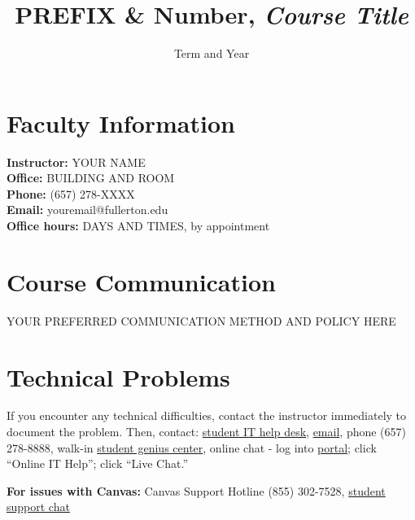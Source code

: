 \documentclass[12pt]{article}
\title{PREFIX \& Number, \textit{Course Title}}
\author{}  %
\date{Term and Year}
\begin{document}

\maketitle

\section*{Faculty Information}
\noindent \textbf{Instructor:} YOUR NAME \\
\noindent \textbf{Office:} BUILDING AND ROOM \\
\noindent \textbf{Phone:} (657) 278-XXXX \\
\noindent \textbf{Email:} youremail@fullerton.edu \\
\noindent \textbf{Office hours:} DAYS AND TIMES, by appointment

\section*{Course Communication}
YOUR PREFERRED COMMUNICATION METHOD AND POLICY HERE

\section*{Technical Problems}
If you encounter any technical difficulties, contact the instructor immediately to document the problem. Then, contact: \href{http://www.fullerton.edu/it/students/helpdesk/index.php}{student IT help desk}, \href{mailto:StudentITHelpDesk@fullerton.edu}{email}, phone (657) 278-8888, walk-in \href{http://www.fullerton.edu/it/students/sgc/index.php}{student genius center}, online chat - log into \href{http://my.fullerton.edu}{portal}; click ``Online IT Help''; click ``Live Chat.''

\vspace{0.5em}
\noindent \textbf{For issues with Canvas:} Canvas Support Hotline (855) 302-7528, \href{https://cases.canvaslms.com/liveagentchat?chattype=student&sfid=001A000000YzcwQIAR}{student support chat}
\end{document}
